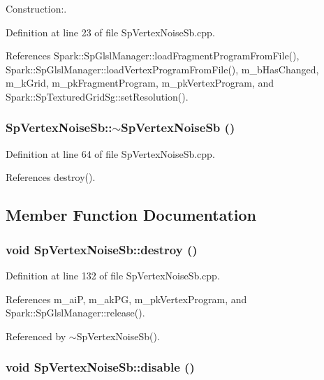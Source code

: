 Construction:. 

Definition at line 23 of file Sp\-Vertex\-Noise\-Sb.cpp.

References Spark::Sp\-Glsl\-Manager::load\-Fragment\-Program\-From\-File(), Spark::Sp\-Glsl\-Manager::load\-Vertex\-Program\-From\-File(), m\_\-b\-Has\-Changed, m\_\-k\-Grid, m\_\-pk\-Fragment\-Program, m\_\-pk\-Vertex\-Program, and Spark::Sp\-Textured\-Grid\-Sg::set\-Resolution().
\subsubsection{\setlength{\rightskip}{0pt plus 5cm}Sp\-Vertex\-Noise\-Sb::$\sim${\bf Sp\-Vertex\-Noise\-Sb} ()\hspace{0.3cm}{\tt  [virtual]}}\label{classSpark_1_1SpVertexNoiseSb_a1}


Definition at line 64 of file Sp\-Vertex\-Noise\-Sb.cpp.

References destroy().

\subsection{Member Function Documentation}
\subsubsection{\setlength{\rightskip}{0pt plus 5cm}void Sp\-Vertex\-Noise\-Sb::destroy ()}\label{classSpark_1_1SpVertexNoiseSb_a3}


Definition at line 132 of file Sp\-Vertex\-Noise\-Sb.cpp.

References m\_\-ai\-P, m\_\-ak\-PG, m\_\-pk\-Vertex\-Program, and Spark::Sp\-Glsl\-Manager::release().

Referenced by $\sim$Sp\-Vertex\-Noise\-Sb().
\subsubsection{\setlength{\rightskip}{0pt plus 5cm}void Sp\-Vertex\-Noise\-Sb::disable ()}\label{classSpark_1_1SpVertexNoiseSb_a6}


